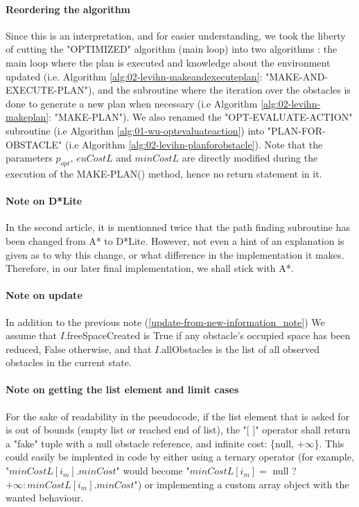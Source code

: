 \paragraph{Reordering the algorithm} Since this is an interpretation, and for easier understanding, we took the liberty of cutting the "OPTIMIZED" algorithm (main loop) into two algorithms : the main loop where the plan is executed and knowledge about the environment updated (i.e. Algorithm \ref{alg:02-levihn-makeandexecuteplan}: "MAKE-AND-EXECUTE-PLAN"), and the subroutine where the iteration over the obstacles is done to generate a new plan when necessary (i.e Algorithm \ref{alg:02-levihn-makeplan}: "MAKE-PLAN"). We also renamed the "OPT-EVALUATE-ACTION" subroutine (i.e Algorithm \ref{alg:01-wu-optevaluateaction}) into "PLAN-FOR-OBSTACLE" (i.e Algorithm \ref{alg:02-levihn-planforobstacle}). Note that the parameters $p_{opt}$, $euCostL$ and $minCostL$ are directly modified during the execution of the MAKE-PLAN() method, hence no return statement in it.

\paragraph{Note on D*Lite}\label{d_star_note} In the second article, it is mentionned twice that the path finding subroutine has been changed from A* to D*Lite. However, not even a hint of an explanation is given as to why this change, or what difference in the implementation it makes. Therefore, in our later final implementation, we shall stick with A*.

\paragraph{Note on update}\label{second_update-from-new-information_note} In addition to the previous note (\ref{update-from-new-information_note}) We assume that $I$.freeSpaceCreated is True if any obstacle's occupied space has been reduced, False otherwise, and that $I$.allObstacles is the list of all observed obstacles in the current state.

\paragraph{Note on getting the list element and limit cases}\label{get_list_element_note} For the sake of readability in the pseudocode, if the list element that is asked for is out of bounds (empty list or reached end of list), the "[ ]" operator shall return a "fake" tuple with a null obstacle reference, and infinite cost: \{null, $+\infty$\}. This could easily be implented in code by either using a ternary operator (for example, "$minCostL[i_{m}].minCost$" would become "$minCostL[i_{m}] =$ null ? $+\infty: minCostL[i_{m}].minCost$") or implementing a custom array object with the wanted behaviour.

